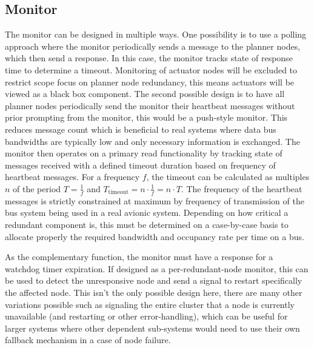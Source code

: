 \subsection{Monitor}

The monitor can be designed in multiple ways. One possibility is to use a polling approach where the monitor periodically sends a message to the planner nodes, which then send a response. In this case, the monitor tracks state of response time to determine a timeout. Monitoring of actuator nodes will be excluded to restrict scope focus on planner node redundancy, this means actuators will be viewed as a black box component.
The second possible design is to have all planner nodes periodically send the monitor their heartbeat messages without prior prompting from the monitor, this would be a push-style monitor. This reduces message count which is beneficial to real systems where data bus bandwidths are typically low and only necessary information is exchanged. The monitor then operates on a primary read functionality by tracking state of messages received with a defined timeout duration based on frequency of heartbeat messages. For a frequency \(f\), the timeout can be calculated as multiples \(n\) of the period \(T = \frac{1}{f}\) and \(T_{\text{timeout}} = n \cdot \frac{1}{f} = n \cdot T\).
The frequency of the heartbeat messages is strictly constrained at maximum by frequency of transmission of the bus system being used in a real avionic system. Depending on how critical a redundant component is, this must be determined on a case-by-case basis to allocate properly the required bandwidth and occupancy rate per time on a bus.

As the complementary function, the monitor must have a response for a watchdog timer expiration. If designed as a per-redundant-node monitor, this can be used to detect the unresponsive node and send a signal to restart specifically the affected node. This isn't the only possible design here, there are many other variations possible such as signaling the entire cluster that a node is currently unavailable (and restarting or other error-handling), which can be useful for larger systems where other dependent sub-systems would need to use their own fallback mechanism in a case of node failure.

